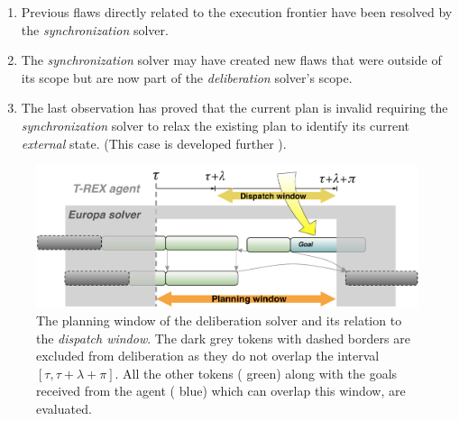 \begin{enumerate}

\item Previous flaws directly related to the execution frontier have
  been resolved by the {\em synchronization} solver.

\item The {\em synchronization} solver may have created new flaws that
  were outside of its scope but are now part of the {\em deliberation}
  solver's scope.

\item The last observation has proved that the current plan is invalid
  requiring the {\em synchronization} solver to relax the existing
  plan to identify its current {\em external} state. (This case is
  developed further ).

\end{enumerate}

\begin{figure}[!htbp]
  \centering
  \includegraphics[width=0.65\columnwidth]{figs/plan_window}
  \caption{\small The planning window of the deliberation solver and
    its relation to the {\em dispatch window}. The dark grey tokens
    with dashed borders are excluded from deliberation as they do not
    overlap the interval $[\tau, \tau+\lambda+\pi]$. All the other
    tokens ({\color{green} green}) along with the goals received from
    the agent ({\color{blue} blue}) which can overlap this window, are
    evaluated.}
  \label{fig:plan:window}
\end{figure}

